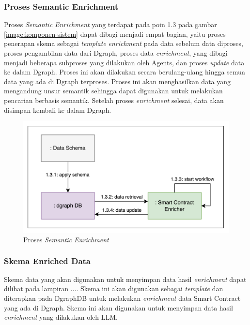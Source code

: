 \subsubsection{Proses Semantic Enrichment}

Proses \textit{Semantic Enrichment} yang terdapat pada poin 1.3 pada gambar \ref{image:komponen-sistem} dapat dibagi menjadi empat bagian, yaitu proses penerapan skema sebagai \textit{template} \textit{enrichment} pada data sebelum data diproses, proses pengambilan data dari Dgraph, proses data \textit{enrichment}, yang dibagi menjadi beberapa subproses yang dilakukan oleh Agents, dan proses \textit{update} data ke dalam Dgraph.
Proses ini akan dilakukan secara berulang-ulang hingga semua data yang ada di Dgraph terproses. Proses ini akan menghasilkan data yang mengandung unsur semantik sehingga dapat digunakan untuk melakukan pencarian berbasis semantik. Setelah proses \textit{enrichment} selesai, data akan disimpan kembali ke dalam Dgraph. 

\begin{figure}[ht]
	\centering
	\includegraphics[width=1\textwidth]{resources/chapter-3/proses-semantik-enrichment.png}
	\caption{Proses \textit{Semantic Enrichment}}
	\label{image:proses-enrichment}
\end{figure}

\subsubsection{Skema Enriched Data}

Skema data yang akan digunakan untuk menyimpan data hasil \textit{enrichment} dapat dilihat pada lampiran .... Skema ini akan digunakan sebagai \textit{template} dan diterapkan pada DgraphDB untuk melakukan \textit{enrichment} data Smart Contract yang ada di Dgraph. Skema ini akan digunakan untuk menyimpan data hasil \textit{enrichment} yang dilakukan oleh LLM.

